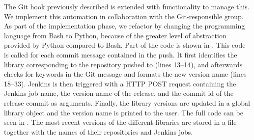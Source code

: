 The Git hook previously described is extended with functionality to manage this. We implement this automation in collaboration with the Git-responsible group. As part of the implementation phase, we refactor by changing the programming language from Bash to Python, because of the greater level of abstraction provided by Python compared to Bash. Part of the code is shown in . This code is called for each commit message contained in the push. It first identifies the library corresponding to the repository pushed to (lines 13--14), and afterwards checks for keywords in the Git message and formats the new version name (lines 18--33). Jenkins is then triggered with a HTTP POST request containing the Jenkins job name, the version name of the release, and the commit id of the release commit as arguments. Finally, the library versions are updated in a global library object and the version name is printed to the user. The full code can be seen in . The most recent versions of the different libraries are stored in a file together with the names of their repositories and Jenkins jobs.

